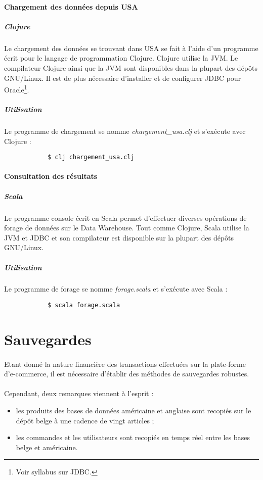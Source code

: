 \documentclass[a4paper,12pt,french]{article}
\begin{document}
    \paragraph{Chargement des données depuis USA}
    
        \subparagraph{Clojure}
        Le chargement des données se trouvant dans USA se fait à l'aide
d'un programme écrit pour le langage de programmation Clojure. Clojure utilise
la JVM. Le compilateur Clojure ainsi que la JVM sont disponibles dans la plupart
des dépôts GNU/Linux. Il est de plus nécessaire d'installer et de configurer
JDBC pour Oracle\footnote{Voir syllabus sur JDBC.}.

        \subparagraph{Utilisation}
        Le programme de chargement se nomme \textit{chargement\_usa.clj}  
et s'exécute avec Clojure :
        \begin{lstlisting}
            $ clj chargement_usa.clj
        \end{lstlisting}   

    \paragraph{Consultation des résultats}

        \subparagraph{Scala}
        Le programme console écrit en Scala permet d'effectuer diverses
opérations de forage de données sur le Data Warehouse. Tout comme Clojure, Scala
utilise la JVM et JDBC et son compilateur est disponible sur la plupart des
dépôts GNU/Linux.

        \subparagraph{Utilisation}
        Le programme de forage se nomme \textit{forage.scala}
et s'exécute avec Scala :
        \begin{lstlisting}
            $ scala forage.scala
        \end{lstlisting}

\appendix

\section{Sauvegardes}
    
    \paragraph{}
    Etant donné la nature financière des transactions effectuées sur la
plate-forme d'e-commerce, il est nécessaire d'établir des méthodes de
sauvegardes robustes. 

    \paragraph{}
    Cependant, deux remarques viennent à l'esprit :
    \begin{itemize}
        \item les produits des bases de données américaine et anglaise sont
recopiés sur le dépôt belge à une cadence de vingt articles ;
        \item les commandes et les utilisateurs sont recopiés en temps réel
entre les bases belge et américaine.
    \end{itemize}
\end{document}
